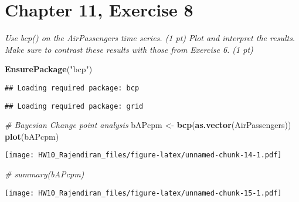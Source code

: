 \documentclass[]{article}
\newenvironment{Shaded}{\begin{snugshade}}{\end{snugshade}}
\newcommand{\CommentTok}[1]{\textcolor[rgb]{0.56,0.35,0.01}{\textit{#1}}}
\newcommand{\DataTypeTok}[1]{\textcolor[rgb]{0.13,0.29,0.53}{#1}}
\newcommand{\DecValTok}[1]{\textcolor[rgb]{0.00,0.00,0.81}{#1}}
\newcommand{\KeywordTok}[1]{\textcolor[rgb]{0.13,0.29,0.53}{\textbf{#1}}}
\newcommand{\NormalTok}[1]{#1}
\newcommand{\OperatorTok}[1]{\textcolor[rgb]{0.81,0.36,0.00}{\textbf{#1}}}
\newcommand{\StringTok}[1]{\textcolor[rgb]{0.31,0.60,0.02}{#1}}
\begin{document}
\hypertarget{chapter-11-exercise-8}{%
\section{Chapter 11, Exercise 8}\label{chapter-11-exercise-8}}

\emph{Use bcp() on the AirPassengers time series. (1 pt) Plot and
interpret the results. Make sure to contrast these results with those
from Exercise 6. (1 pt)}

\begin{Shaded}
\begin{Highlighting}[]
\KeywordTok{EnsurePackage}\NormalTok{(}\StringTok{"bcp"}\NormalTok{)}
\end{Highlighting}
\end{Shaded}

\begin{verbatim}
## Loading required package: bcp
\end{verbatim}

\begin{verbatim}
## Loading required package: grid
\end{verbatim}

\begin{Shaded}
\begin{Highlighting}[]
\CommentTok{# Bayesian Change point analysis}
\NormalTok{bAPcpm <-}\StringTok{ }\KeywordTok{bcp}\NormalTok{(}\KeywordTok{as.vector}\NormalTok{(AirPassengers))}
\KeywordTok{plot}\NormalTok{(bAPcpm)}
\end{Highlighting}
\end{Shaded}

\texttt{[image: HW10\_Rajendiran\_files/figure-latex/unnamed-chunk-14-1.pdf]}

\begin{Shaded}
\begin{Highlighting}[]
\CommentTok{# summary(bAPcpm)}
\end{Highlighting}
\end{Shaded}

\begin{Shaded}
\end{Shaded}

\texttt{[image: HW10\_Rajendiran\_files/figure-latex/unnamed-chunk-15-1.pdf]}
\end{document}
